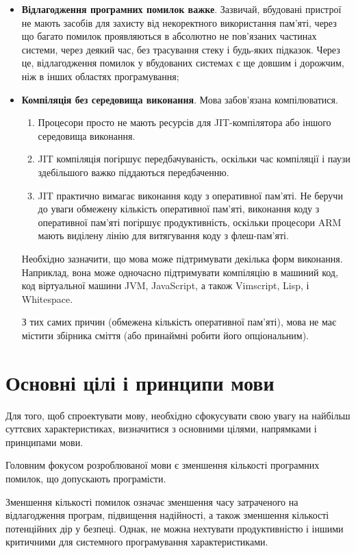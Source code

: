 \documentclass[main.tex]{subfiles}
\begin{document}
\begin{itemize}[nosep]
\item \textbf{Відлагодження програмних помилок важке}. Зазвичай, вбудовані пристрої не мають засобів для захисту від некоректного використання пам'яті, через що багато помилок проявляються в абсолютно не пов'язаних частинах системи, через деякий час, без трасування стеку і будь-яких підказок. Через це, відлагодження помилок у вбудованих системах є ще довшим і дорожчим, ніж в інших областях програмування;

\item \textbf{Компіляція без середовища виконання}. Мова забов'язана компілюватися.

\begin{enumerate}[nosep]
\item Процесори просто не мають ресурсів для JIT-компілятора або іншого середовища виконання.
\item JIT компіляція погіршує передбачуваність, оскільки час компіляції і паузи здебільшого важко піддаються передбаченню.
\item JIT практично вимагає виконання коду з оперативної пам'яті. Не беручи до уваги обмежену кількість оперативної пам'яті, виконання коду з оперативної пам'яті погіршує продуктивність, оскільки процесори ARM мають виділену лінію для витягування коду з флеш-пам'яті.
\end{enumerate}

Необхідно зазначити, що мова може підтримувати декілька форм виконання. Наприклад, вона може одночасно підтримувати компіляцію в машиний код, код віртуальної машини JVM, JavaScript, а також Vimscript, Lisp, і Whitespace.

З тих самих причин (обмежена кількість оперативної пам'яті), мова не має містити збірника сміття (або принаймні робити його опціональним).
\end{itemize}

\section{Основні цілі і принципи мови}
Для того, щоб спроектувати мову, необхідно сфокусувати свою увагу на найбільш суттєвих характеристиках, визначитися з основними цілями, напрямками і принципами мови.

Головним фокусом розроблюваної мови є зменшення кількості програмних помилок, що допускають програмісти.

Зменшення кількості помилок означає зменшення часу затраченого на відлагодження програм, підвищення надійності, а також зменшення кількості потенційних дір у безпеці.
Однак, не можна нехтувати продуктивністю і іншими критичними для системного програмування характеристиками.
\end{document}
